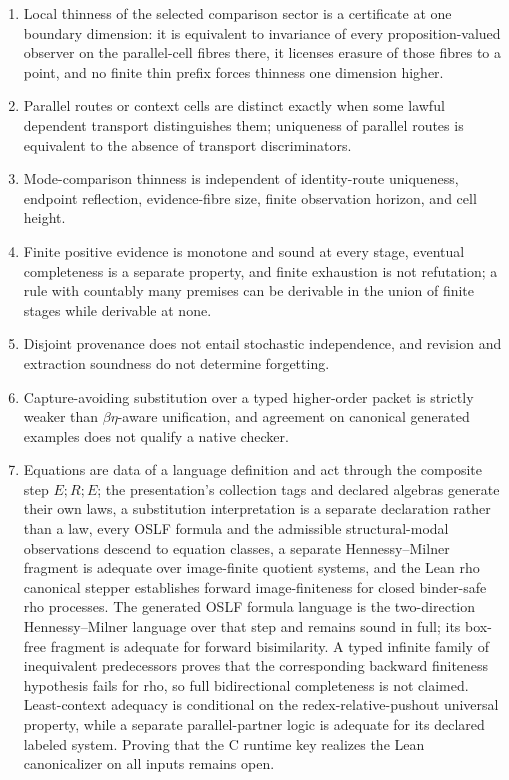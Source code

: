 \documentclass[11pt]{article}
\theoremstyle{definition}
\theoremstyle{remark}
\begin{document}
\begin{enumerate}
  evidence without replacing the ethical ontology.
\item Local thinness of the selected comparison sector is a certificate at one
  boundary dimension: it is equivalent to invariance of every
  proposition-valued observer on the parallel-cell fibres there, it licenses
  erasure of those fibres to a point, and no finite thin prefix forces
  thinness one dimension higher.
\item Parallel routes or context cells are distinct exactly when some lawful
  dependent transport distinguishes them; uniqueness of parallel routes is
  equivalent to the absence of transport discriminators.
\item Mode-comparison thinness is independent of identity-route uniqueness,
  endpoint reflection, evidence-fibre size, finite observation horizon, and
  cell height.
\item Finite positive evidence is monotone and sound at every stage, eventual
  completeness is a separate property, and finite exhaustion is not
  refutation; a rule with countably many premises can be derivable in the
  union of finite stages while derivable at none.
\item Disjoint provenance does not entail stochastic independence, and
  revision and extraction soundness do not determine forgetting.
\item Capture-avoiding substitution over a typed higher-order packet is strictly
  weaker than $\beta\eta$-aware unification, and agreement on canonical
  generated examples does not qualify a native checker.
\item Equations are data of a language definition and act through the
  composite step $E;R;E$; the presentation's collection tags and declared
  algebras generate their own laws, a substitution interpretation is a
  separate declaration rather than a law, every OSLF formula and the
  admissible structural-modal observations descend to equation classes, a
  separate Hennessy--Milner fragment is adequate over image-finite quotient
  systems, and the Lean rho canonical stepper establishes forward
  image-finiteness for closed binder-safe rho processes.  The generated OSLF
  formula language is the two-direction Hennessy--Milner language over that
  step and remains sound in full; its box-free fragment is adequate for
  forward bisimilarity.  A typed infinite family of inequivalent predecessors
  proves that the corresponding backward finiteness hypothesis fails for rho,
  so full bidirectional completeness is not claimed.  Least-context adequacy
  is conditional on the redex-relative-pushout universal property, while a
  separate parallel-partner logic is adequate for its declared labeled
  system.  Proving that the C runtime key realizes the Lean canonicalizer on
  all inputs remains open.
\end{enumerate}
\end{document}

